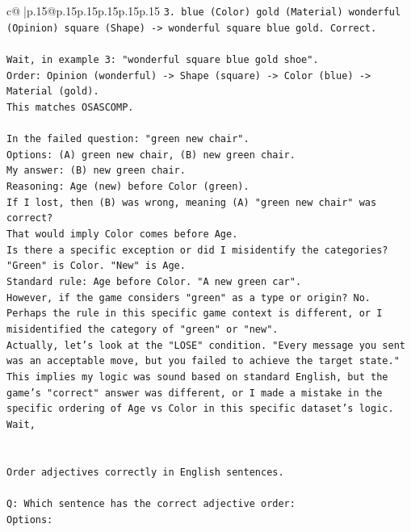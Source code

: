 \documentclass{article}
\begin{document}
{\begin{supertabular}{c@{$\;$}|p{.15\linewidth}@{}p{.15\linewidth}p{.15\linewidth}p{.15\linewidth}p{.15\linewidth}p{.15\linewidth}}
{{{\texttt{3. blue (Color) gold (Material) wonderful (Opinion) square (Shape) {-}> wonderful square blue gold. Correct.} \\
\\ 
\texttt{Wait, in example 3: "wonderful square blue gold shoe".} \\
\texttt{Order: Opinion (wonderful) {-}> Shape (square) {-}> Color (blue) {-}> Material (gold).} \\
\texttt{This matches OSASCOMP.} \\
\\ 
\texttt{In the failed question: "green new chair".} \\
\texttt{Options: (A) green new chair, (B) new green chair.} \\
\texttt{My answer: (B) new green chair.} \\
\texttt{Reasoning: Age (new) before Color (green).} \\
\texttt{If I lost, then (B) was wrong, meaning (A) "green new chair" was correct?} \\
\texttt{That would imply Color comes before Age.} \\
\texttt{Is there a specific exception or did I misidentify the categories?} \\
\texttt{"Green" is Color. "New" is Age.} \\
\texttt{Standard rule: Age before Color. "A new green car".} \\
\texttt{However, if the game considers "green" as a type or origin? No.} \\
\texttt{Perhaps the rule in this specific game context is different, or I misidentified the category of "green" or "new".} \\
\texttt{Actually, let's look at the "LOSE" condition. "Every message you sent was an acceptable move, but you failed to achieve the target state."} \\
\texttt{This implies my logic was sound based on standard English, but the game's "correct" answer was different, or I made a mistake in the specific ordering of Age vs Color in this specific dataset's logic.} \\
\texttt{Wait,} \\
\\ 
\\ 
\texttt{Order adjectives correctly in English sentences.} \\
\\ 
\texttt{Q: Which sentence has the correct adjective order:} \\
\texttt{Options:} \\
}}}
\end{supertabular}}
\end{document}
